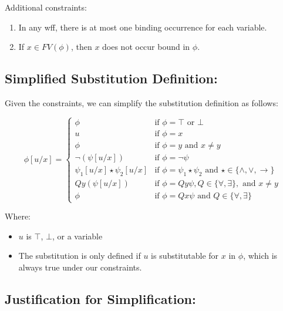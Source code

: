 \documentclass{article}
\begin{document}
Additional constraints:
\begin{enumerate}
    \item In any wff, there is at most one binding occurrence for each variable.
    \item If $x \in FV(\phi)$, then $x$ does not occur bound in $\phi$.
\end{enumerate}

\subsection*{Simplified Substitution Definition:}

Given the constraints, we can simplify the substitution definition as follows:

\[
\phi[u/x] =
\begin{cases}
    \phi                   & \text{if } \phi = \top \text{ or } \bot \\
    u                      & \text{if } \phi = x \\
    \phi                   & \text{if } \phi = y \text{ and } x \neq y \\
    \neg(\psi[u/x])        & \text{if } \phi = \neg\psi \\
    \psi_1[u/x] \star \psi_2[u/x]  & \text{if } \phi = \psi_1 \star \psi_2 \text{ and } \star \in \{\wedge, \vee, \rightarrow\} \\
    Qy (\psi[u/x])         & \text{if } \phi = Qy \psi, Q \in \{\forall, \exists\}, \text{ and } x \neq y \\
    \phi                   & \text{if } \phi = Qx \psi \text{ and } Q \in \{\forall, \exists\}
\end{cases}
\]

Where:
\begin{itemize}
    \item $u$ is $\top$, $\bot$, or a variable
    \item The substitution is only defined if $u$ is substitutable for $x$ in $\phi$, which is always true under our constraints.
\end{itemize}

\subsection*{Justification for Simplification:}
\end{document}
